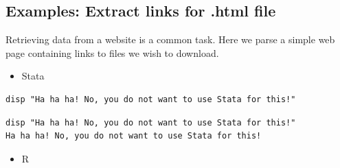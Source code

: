 \documentclass[]{book}
\newenvironment{Shaded}{\begin{snugshade}}{\end{snugshade}}
\newcommand{\CharTok}[1]{\textcolor[rgb]{0.31,0.60,0.02}{#1}}
\newcommand{\DataTypeTok}[1]{\textcolor[rgb]{0.13,0.29,0.53}{#1}}
\newcommand{\KeywordTok}[1]{\textcolor[rgb]{0.13,0.29,0.53}{\textbf{#1}}}
\newcommand{\NormalTok}[1]{#1}
\newcommand{\OtherTok}[1]{\textcolor[rgb]{0.56,0.35,0.01}{#1}}
\newcommand{\StringTok}[1]{\textcolor[rgb]{0.31,0.60,0.02}{#1}}
\providecommand{\tightlist}{%
  \setlength{\itemsep}{0pt}\setlength{\parskip}{0pt}}
\begin{document}
\hypertarget{examples-extract-links-for-.html-file}{%
\subsection{Examples: Extract links for .html file}\label{examples-extract-links-for-.html-file}}

Retrieving data from a website is a common task. Here we parse a simple web page containing links to files we wish to download.

\begin{itemize}
\tightlist
\item
  Stata
\end{itemize}

\begin{verbatim}
disp "Ha ha ha! No, you do not want to use Stata for this!"
\end{verbatim}

\begin{verbatim}
disp "Ha ha ha! No, you do not want to use Stata for this!"
Ha ha ha! No, you do not want to use Stata for this!
\end{verbatim}

\begin{itemize}
\tightlist
\item
  R
\end{itemize}

\begin{Shaded}
\end{Shaded}
\end{document}
